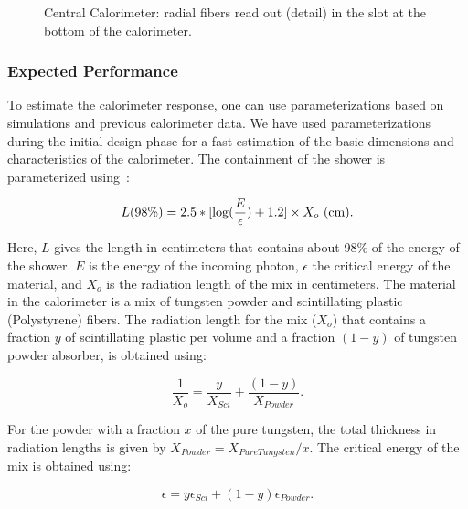 \begin{figure}
\vspace{8.0cm} 
\caption{\small{Central Calorimeter: radial fibers read out (detail) in the 
slot at the bottom of the calorimeter.}}
\label{yrs4}
\end{figure}

\subsubsection{Expected Performance}

To estimate the calorimeter response, one can use parameterizations based 
on simulations and previous calorimeter data. We have used parameterizations 
during the initial design phase for a fast estimation of the basic 
dimensions and characteristics of the calorimeter.  The containment of the 
shower is parameterized using~\cite{Fab85}:

\begin{equation}
L (98\%) = 2.5*[\log(\frac{E}{\epsilon}) + 1.2] \times X_o~{\rm (cm)}.
\end{equation}

Here, $L$ gives the length in centimeters that contains about 98\% of the 
energy of the shower.  $E$ is the energy of the incoming photon, $\epsilon$ 
the critical energy of the material, and $X_o$ is the radiation length of 
the mix in centimeters.  The material in the calorimeter is a mix of 
tungsten powder and scintillating plastic (Polystyrene) fibers.  The 
radiation length for the mix ($X_o$) that contains a fraction $y$ of 
scintillating plastic per volume and a fraction $(1-y)$ of tungsten powder 
absorber, is obtained using:

\begin{equation}
\frac{1}{X_o} = \frac{y}{X_{Sci}} + \frac{(1-y)}{X_{Powder}}.
\end{equation} 

For the powder with a fraction $x$ of the pure tungsten, the total
thickness in radiation lengths is given by $X_{Powder}=X_{Pure Tungsten}/x$.
The critical energy of the mix is obtained using: 
 
\begin{equation}
\epsilon = y \epsilon_{Sci} + (1-y) \epsilon_{Powder}.
\end{equation}

